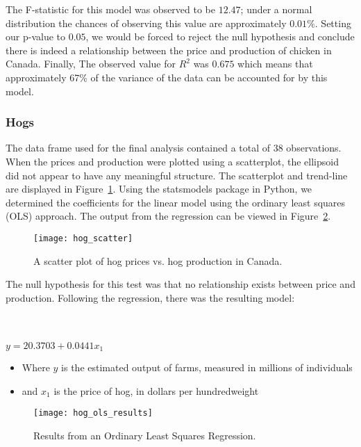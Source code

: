 The F-statistic for this model was observed to be $12.47$; under a normal distribution the chances of observing this value are approximately $0.01\%$.
Setting our p-value to $0.05$, we would be forced to reject the null hypothesis and conclude there is indeed a relationship between the price and production of chicken in Canada.
Finally, The observed value for $R^2$ was $0.675$ which means that approximately 67\% of the variance of the data can be accounted for by this model.

\subsubsection{Hogs}

The data frame used for the final analysis contained a total of 38 observations.
When the prices and production were plotted using a scatterplot, the ellipsoid did not appear to have any meaningful structure.
The scatterplot and trend-line are displayed in Figure~\ref{fig:hog_scatter}.
Using the statsmodels package in Python, we determined the coefficients for the linear model using the ordinary least squares (OLS) approach.
The output from the regression can be viewed in Figure~\ref{fig:hog_ols}.

\begin{figure}
    \texttt{[image: hog\_scatter]}
    \caption{A scatter plot of hog prices vs. hog production in Canada.}
    \label{fig:hog_scatter}
\end{figure}

The null hypothesis for this test was that no relationship exists between price and production.
Following the regression, there was the resulting model:

\\~\\

\tabto{5cm} $y = 20.3703 + 0.0441x_1$

\begin{itemize}
    \item Where $y$ is the estimated output of farms, measured in millions of individuals
    \item and $x_1$ is the price of hog, in dollars per hundredweight
\end{itemize}

\begin{figure}
    \texttt{[image: hog\_ols\_results]}
    \caption{Results from an Ordinary Least Squares Regression.}
    \label{fig:hog_ols}
\end{figure}


